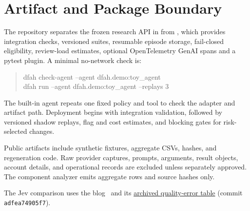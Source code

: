 \documentclass{article}
\begin{document}
\section{Artifact and Package Boundary}
\label{app:artifact}

The repository separates the frozen research API in  from
, which provides integration checks, versioned suites, resumable
episode storage, fail-closed eligibility, review-load estimates, optional
OpenTelemetry GenAI spans and a pytest plugin. A minimal no-network check is:

\begin{quote}
\small\ttfamily
dfah check-agent --agent dfah.demo:toy\_agent\\
dfah run --agent dfah.demo:toy\_agent --replays 3
\end{quote}

The built-in agent repeats one fixed policy and tool to check the adapter and
artifact path. Deployment begins with integration validation, followed by
versioned shadow replays, flag and cost estimates, and blocking gates for
risk-selected changes.

Public artifacts include synthetic fixtures, aggregate CSVs, hashes, and
regeneration code.  Raw provider captures, prompts, arguments, result
objects, account details, and operational records are excluded unless
separately approved.  The component analyzer emits aggregate rows and source
hashes only.

The Jev comparison uses the blog~\citep{shea2026jevjudge} and its
\href{https://github.com/danielgshea/jev-as-a-judge/blob/adfea74905f721ea2594e22804c8c8edf1693163/assets/benchmark-jev-luna-terra-sonnet-oracle/6d08df72-c878-458c-b7c5-a7824ee6e721/accuracy.json}{archived quality-error table}
(commit \texttt{adfea74905f7}).


\end{document}
